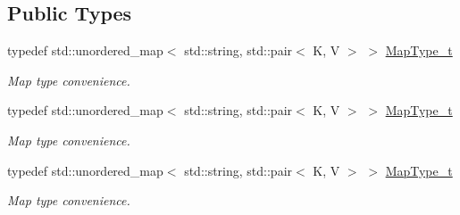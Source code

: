 \subsection*{Public Types}
\begin{DoxyCompactItemize}
\item 
typedef std\+::unordered\+\_\+map$<$ std\+::string, std\+::pair$<$ K, V $>$ $>$ \mbox{\hyperlink{classADAT_1_1MapObjectIterator_ad159a70384669e35c10ddb298c4d1ba8}{Map\+Type\+\_\+t}}
\begin{DoxyCompactList}\small\item\em Map type convenience. \end{DoxyCompactList}\item 
typedef std\+::unordered\+\_\+map$<$ std\+::string, std\+::pair$<$ K, V $>$ $>$ \mbox{\hyperlink{classADAT_1_1MapObjectIterator_ad159a70384669e35c10ddb298c4d1ba8}{Map\+Type\+\_\+t}}
\begin{DoxyCompactList}\small\item\em Map type convenience. \end{DoxyCompactList}\item 
typedef std\+::unordered\+\_\+map$<$ std\+::string, std\+::pair$<$ K, V $>$ $>$ \mbox{\hyperlink{classADAT_1_1MapObjectIterator_ad159a70384669e35c10ddb298c4d1ba8}{Map\+Type\+\_\+t}}
\begin{DoxyCompactList}\small\item\em Map type convenience. \end{DoxyCompactList}\end{DoxyCompactItemize}
